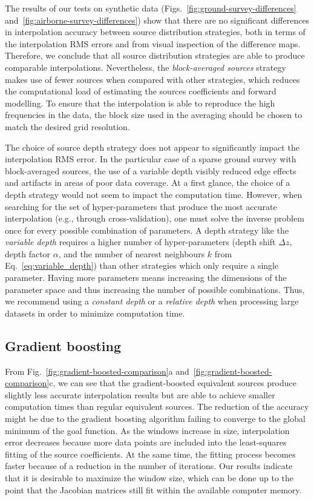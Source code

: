 The results of our tests on synthetic data
(Figs.~\ref{fig:ground-survey-differences}
and~\ref{fig:airborne-survey-differences}) show that there are no significant
differences in interpolation accuracy between source distribution strategies,
both in terms of the interpolation RMS errors and from visual inspection of the
difference maps.
Therefore, we conclude that all source distribution strategies are able to
produce comparable interpolations.
Nevertheless, the \emph{block-averaged sources} strategy makes use of fewer
sources when compared with other strategies, which reduces the computational
load of estimating the sources coefficients and forward modelling.
To ensure that the interpolation is able to reproduce the high frequencies in
the data, the block size used in the averaging should be chosen to match the
desired grid resolution.

The choice of source depth strategy does not appear to significantly impact the
interpolation RMS error.
In the particular case of a sparse ground survey with block-averaged sources,
the use of a variable depth visibly reduced edge effects and artifacts in areas
of poor data coverage.
At a first glance, the choice of a depth strategy would not seem to impact
the computation time.
However, when searching for the set of hyper-parameters that produce the most
accurate interpolation (e.g., through cross-validation), one must solve the
inverse problem once for every possible combination of parameters.
A depth strategy like the \emph{variable depth} requires a higher number of
hyper-parameters (depth shift $\Delta z$, depth factor $\alpha$, and the number
of nearest neighbours $k$ from Eq.~\ref{eq:variable_depth}) than other
strategies which only require a single parameter.
Having more parameters means increasing the dimensions of the parameter space
and thus increasing the number of possible combinations.
Thus, we recommend using a \emph{constant depth} or a \emph{relative depth}
when processing large datasets in order to minimize computation time.

\subsection{Gradient boosting}

From Fig.~\ref{fig:gradient-boosted-comparison}a
and~\ref{fig:gradient-boosted-comparison}c, we can see that the
gradient-boosted equivalent sources produce slightly less accurate
interpolation results but are able to achieve smaller computation times than
regular equivalent sources.
The reduction of the accuracy might be due to the gradient boosting algorithm
failing to converge to the global minimum of the goal function.
As the windows increase in size, interpolation error decreases because more data
points are included into the least-squares fitting of the source coefficients.
At the same time, the fitting process becomes faster because of a reduction in
the number of iterations.
Our results indicate that it is desirable to maximize the window size,
which can be done up to the point that the Jacobian matrices still fit within
the available computer memory.

